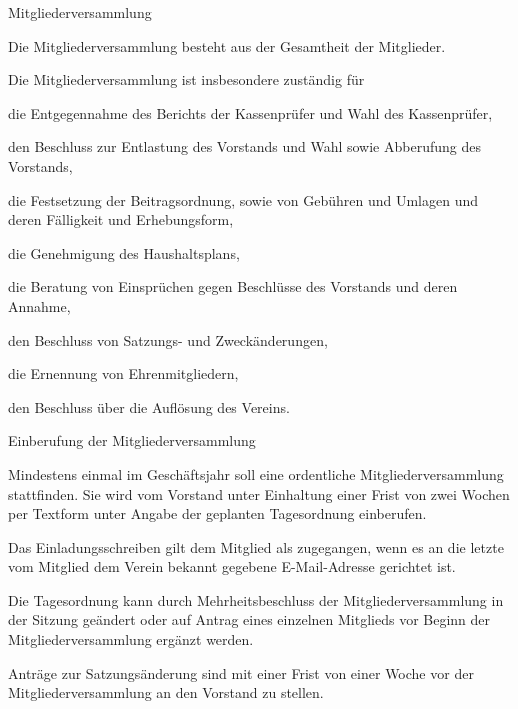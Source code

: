 \documentclass[11pt,a4paper,twoside,openany,article]{memoir}
\begin{document}
\begin{para}{Mitgliederversammlung}
  \label{p:mv}
  \item Die Mitgliederversammlung besteht aus der Gesamtheit der Mitglieder.
  \item Die Mitgliederversammlung ist insbesondere zuständig für
  \begin{subpara}
    \item die Entgegennahme des Berichts der Kassenprüfer und Wahl des Kassenprüfer,
    \item den Beschluss zur Entlastung des Vorstands und Wahl sowie Abberufung des Vorstands,
    \item die Festsetzung der Beitragsordnung, sowie von Gebühren und Umlagen und deren Fälligkeit und Erhebungsform,
    \item die Genehmigung des Haushaltsplans,
    \item die Beratung von Einsprüchen gegen Beschlüsse des Vorstands und deren Annahme,
    \item den Beschluss von Satzungs- und Zweckänderungen,
    \item die Ernennung von Ehrenmitgliedern,
    \item den Beschluss über die Auflösung des Vereins.
  \end{subpara}
\end{para}

\begin{para}{Einberufung der Mitgliederversammlung}
  \label{p:mveinberufung}
  \item Mindestens einmal im Geschäftsjahr soll eine ordentliche Mitgliederversammlung stattfinden. Sie wird vom Vorstand unter Einhaltung einer Frist von zwei Wochen per Textform unter Angabe der geplanten Tagesordnung einberufen.
  \item Das Einladungsschreiben gilt dem Mitglied als zugegangen, wenn es an die letzte vom Mitglied dem Verein bekannt gegebene E-Mail-Adresse gerichtet ist.
  \item Die Tagesordnung kann durch Mehrheitsbeschluss der Mitgliederversammlung in der Sitzung geändert oder auf Antrag eines einzelnen Mitglieds vor Beginn der Mitgliederversammlung ergänzt werden.
  \item Anträge zur Satzungsänderung sind mit einer Frist von einer Woche vor der Mitgliederversammlung an den Vorstand zu stellen.
\end{para}
\end{document}
